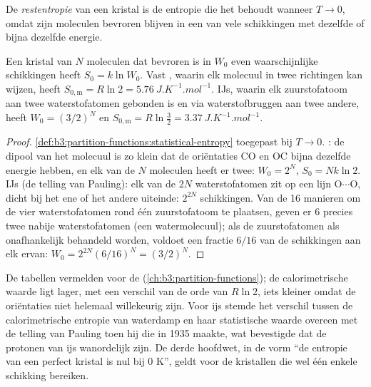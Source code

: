 \begin{definition}[Restentropie]\label{def:b3:statistical-thermo-applied:residual-entropy}
De \emph{restentropie} van een kristal is de entropie
die het behoudt wanneer $T \to 0$, omdat zijn moleculen bevroren blijven in
een van vele schikkingen met dezelfde of bijna dezelfde energie.
\end{definition}

\begin{proposition}\label{prop:b3:statistical-thermo-applied:residual}
Een kristal van $N$ moleculen dat bevroren is in $W_0$ even waarschijnlijke
schikkingen heeft $S_0 =
k\ln W_0$. Vast , waarin elk molecuul in twee richtingen kan
wijzen, heeft $S_{0,\mathrm m} = R\ln2 =
\qty{5.76}{J.K^{-1}.mol^{-1}}$. IJs, waarin elk zuurstofatoom aan twee
waterstofatomen gebonden is en via waterstofbruggen aan twee andere, heeft
$W_0 = (3/2)^N$ en $S_{0,\mathrm m} = R\ln\frac32 =
\qty{3.37}{J.K^{-1}.mol^{-1}}$.
\end{proposition}

\begin{proof}
\cref{def:b3:partition-functions:statistical-entropy} toegepast bij $T \to 0$.
: de dipool van het molecuul is zo klein dat de oriëntaties CO en OC
bijna dezelfde energie hebben, en elk van de $N$ moleculen heeft er twee: $W_0 = 2^N$,
$S_0 = Nk\ln2$. IJs (de telling van Pauling): elk van de $2N$
waterstofatomen zit op een lijn O$\cdots$O, dicht bij het ene of het andere
uiteinde: $2^{2N}$ schikkingen. Van de 16 manieren om de vier
waterstofatomen rond één zuurstofatoom te plaatsen, geven er 6 precies twee
nabije waterstofatomen (een watermolecuul); als de zuurstofatomen als
onafhankelijk behandeld worden, voldoet een fractie
$6/16$ van de schikkingen aan elk ervan: $W_0 = 2^{2N}(6/16)^N = (3/2)^N$.
\end{proof}

De tabellen vermelden voor  de 
(\cref{ch:b3:partition-functions}); de calorimetrische waarde ligt lager,
met een verschil van de orde van $R\ln2$, iets kleiner omdat de
oriëntaties niet helemaal willekeurig zijn. Voor ijs stemde het verschil
tussen de calorimetrische entropie van waterdamp en haar statistische
waarde overeen met de telling van Pauling toen hij die in 1935 maakte, wat
bevestigde dat de protonen van ijs wanordelijk zijn. De derde hoofdwet,
in de vorm ``de entropie van een perfect kristal is nul bij 0 K'', geldt
voor de kristallen die wel één enkele schikking bereiken.

